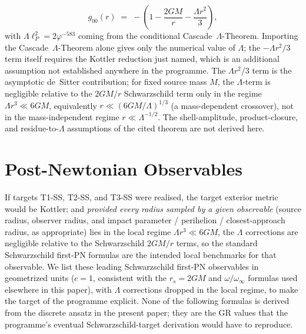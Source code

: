 \documentclass[12pt]{article}
\theoremstyle{definition}
\theoremstyle{remark}
\begin{document}
\begin{equation}
g_{00}(r) \;=\; -\left(1 - \frac{2GM}{r} - \frac{\Lambda r^2}{3}\right),
\end{equation}
with $\Lambda \ell_P^2 = 2\varphi^{-583}$ coming from the conditional Cascade~$\Lambda$-Theorem. Importing the Cascade~$\Lambda$-Theorem alone gives only the numerical value of $\Lambda$; the $-\Lambda r^2/3$ term itself requires the Kottler reduction just named, which is an additional assumption not established anywhere in the programme. The $\Lambda r^2/3$ term is the asymptotic de~Sitter contribution; for fixed source mass $M$, the $\Lambda$-term is negligible relative to the $2GM/r$ Schwarzschild term only in the regime $\Lambda r^3 \ll 6GM$, equivalently $r \ll (6GM/\Lambda)^{1/3}$ (a mass-dependent crossover), not in the mass-independent regime $r \ll \Lambda^{-1/2}$. The shell-amplitude, product-closure, and residue-to-$\Lambda$ assumptions of the cited theorem are not derived here.

\section{Post-Newtonian Observables}\label{sec:pn-obs}

If targets T1-SS, T2-SS, and T3-SS were realised, the target exterior metric would be Kottler; and \emph{provided every radius sampled by a given observable} (source radius, observer radius, and impact parameter / perihelion / closest-approach radius, as appropriate) lies in the local regime $\Lambda r^3 \ll 6GM$, the $\Lambda$ corrections are negligible relative to the Schwarzschild $2GM/r$ terms, so the standard Schwarzschild first-PN formulas are the intended local benchmarks for that observable. We list these leading Schwarzschild first-PN observables in geometrized units ($c = 1$, consistent with the $r_s = 2GM$ and $\omega/\omega_\infty$ formulas used elsewhere in this paper), with $\Lambda$ corrections dropped in the local regime, to make the target of the programme explicit. None of the following formulas is derived from the discrete ansatz in the present paper; they are the GR values that the programme's eventual Schwarzschild-target derivation would have to reproduce.
\end{document}

